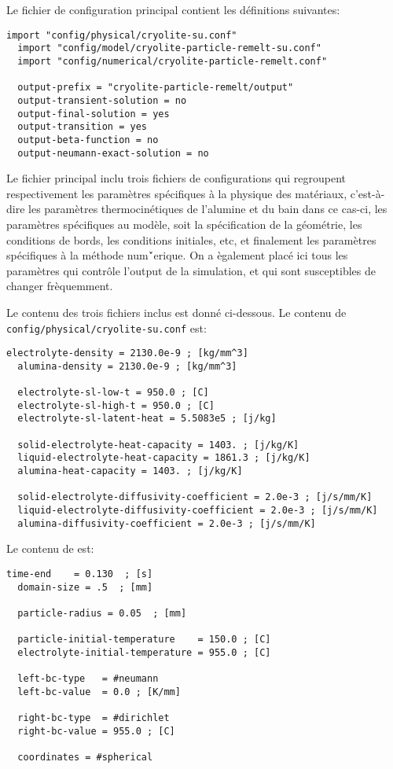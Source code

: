 Le fichier de configuration principal
 contient les d\'efinitions
suivantes:
\begin{lstlisting}[language={},frame=single,basicstyle=\ttfamily]
  import "config/physical/cryolite-su.conf"
  import "config/model/cryolite-particle-remelt-su.conf"
  import "config/numerical/cryolite-particle-remelt.conf"
  
  output-prefix = "cryolite-particle-remelt/output"
  output-transient-solution = no
  output-final-solution = yes
  output-transition = yes
  output-beta-function = no
  output-neumann-exact-solution = no
\end{lstlisting}
Le fichier principal inclu trois fichiers de configurations qui
regroupent respectivement les param\`etres sp\'ecifiques \`a la
physique des mat\'eriaux, c'est-\`a-dire les param\`etres
thermocin\'etiques de l'alumine et du bain dans ce cas-ci, les
param\`etres sp\'ecifiques au mod\`ele, soit la sp\'ecification de la
g\'eom\'etrie, les conditions de bords, les conditions initiales, etc,
et finalement les param\`etres sp\'ecifiques \`a la m\'ethode
num\'`erique. On a \`egalement plac\'e ici tous les param\`etres qui
contr\^ole l'output de la simulation, et qui sont susceptibles de
changer fr\`equemment.

Le contenu des trois fichiers inclus est donn\'e ci-dessous. Le
contenu de \texttt{config/physical/cryolite-\-su.conf} est:
\begin{lstlisting}[language={},frame=single,basicstyle=\ttfamily]
  electrolyte-density = 2130.0e-9 ; [kg/mm^3]
  alumina-density = 2130.0e-9 ; [kg/mm^3]
  
  electrolyte-sl-low-t = 950.0 ; [C]
  electrolyte-sl-high-t = 950.0 ; [C]
  electrolyte-sl-latent-heat = 5.5083e5 ; [j/kg]
  
  solid-electrolyte-heat-capacity = 1403. ; [j/kg/K]
  liquid-electrolyte-heat-capacity = 1861.3 ; [j/kg/K]
  alumina-heat-capacity = 1403. ; [j/kg/K]
  
  solid-electrolyte-diffusivity-coefficient = 2.0e-3 ; [j/s/mm/K]
  liquid-electrolyte-diffusivity-coefficient = 2.0e-3 ; [j/s/mm/K]
  alumina-diffusivity-coefficient = 2.0e-3 ; [j/s/mm/K]
\end{lstlisting}

Le contenu de  est:
\begin{lstlisting}[language={},frame=single,basicstyle=\ttfamily]
  time-end    = 0.130  ; [s]
  domain-size = .5  ; [mm]
  
  particle-radius = 0.05  ; [mm]
  
  particle-initial-temperature    = 150.0 ; [C]
  electrolyte-initial-temperature = 955.0 ; [C]
  
  left-bc-type   = #neumann
  left-bc-value  = 0.0 ; [K/mm]
  
  right-bc-type  = #dirichlet
  right-bc-value = 955.0 ; [C]
  
  coordinates = #spherical
\end{lstlisting}


